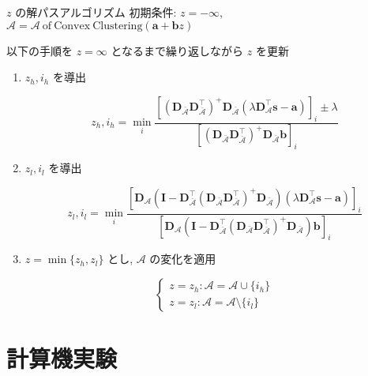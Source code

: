 \documentclass[dvipdfmx, 10pt]{beamer}
\begin{document}
\begin{frame}{$z$ の解パスアルゴリズム}
    初期条件: $z = -\infty$, $\mathcal{A} = \mathcal{A} \mathrm{\ of\ Convex\ Clustering}(\bm{a} + \bm{b} z)$
    
    以下の手順を $z = \infty$ となるまで繰り返しながら $z$ を更新
    \begin{enumerate}
        \item $z_h, i_h$ を導出

        \[
            z_h, i_h = \min_i \frac{
                [(\bm{D}_{\bar{\mathcal{A}}} \bm{D}_{\bar{\mathcal{A}}}^{\top})^+ \bm{D}_{\bar{\mathcal{A}}} (\lambda \bm{D}_{\mathcal{A}}^{\top} \bm{s} - \bm{a})]_i \pm \lambda
            }{
                [(\bm{D}_{\bar{\mathcal{A}}} \bm{D}_{\bar{\mathcal{A}}}^{\top})^+ \bm{D}_{\bar{\mathcal{A}}} \bm{b}]_i
            }
        \]
        \item $z_l, i_l$ を導出

        \[
            z_l, i_l = \min_i \frac{
                [\bm{D}_{\mathcal{A}} (\bm{I} - \bm{D}_{\bar{\mathcal{A}}}^{\top}(\bm{D}_{\bar{\mathcal{A}}} \bm{D}_{\bar{\mathcal{A}}}^{\top})^+ \bm{D}_{\bar{\mathcal{A}}}) (\lambda \bm{D}_{\mathcal{A}}^{\top} \bm{s} - \bm{a})]_i
            }{
                [\bm{D}_{\mathcal{A}} (\bm{I} - \bm{D}_{\bar{\mathcal{A}}}^{\top}(\bm{D}_{\bar{\mathcal{A}}} \bm{D}_{\bar{\mathcal{A}}}^{\top})^+ \bm{D}_{\bar{\mathcal{A}}}) \bm{b}]_i
            }
        \]
        \item $z = \min\{z_h, z_l\}$ とし, $\mathcal{A}$ の変化を適用
        
        \[
            \begin{cases}
                z = z_h : \mathcal{A} = \mathcal{A} \cup \{i_h\} \\
                z = z_l : \mathcal{A} = \mathcal{A} \setminus \{i_l\}
            \end{cases}
        \]

    \end{enumerate}
\end{frame}
  

\section{計算機実験}

\end{document}
